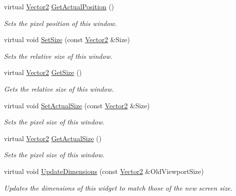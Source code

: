 \begin{DoxyCompactItemize}
virtual \hyperlink{classphys_1_1Vector2}{Vector2} \hyperlink{classphys_1_1UI_1_1Window_a811fb495bc698752e03778b18f2b1a30}{GetActualPosition} ()
\begin{DoxyCompactList}\small\item\em Sets the pixel position of this window. \item\end{DoxyCompactList}\item 
virtual void \hyperlink{classphys_1_1UI_1_1Window_a88ed4d21758cee9afeadc4069c3e0b04}{SetSize} (const \hyperlink{classphys_1_1Vector2}{Vector2} \&Size)
\begin{DoxyCompactList}\small\item\em Sets the relative size of this window. \item\end{DoxyCompactList}\item 
virtual \hyperlink{classphys_1_1Vector2}{Vector2} \hyperlink{classphys_1_1UI_1_1Window_a9946100eb6e6e985921bbea9e87cede3}{GetSize} ()
\begin{DoxyCompactList}\small\item\em Gets the relative size of this window. \item\end{DoxyCompactList}\item 
virtual void \hyperlink{classphys_1_1UI_1_1Window_a002150cd8db87283bead5f10b2310152}{SetActualSize} (const \hyperlink{classphys_1_1Vector2}{Vector2} \&Size)
\begin{DoxyCompactList}\small\item\em Sets the pixel size of this window. \item\end{DoxyCompactList}\item 
virtual \hyperlink{classphys_1_1Vector2}{Vector2} \hyperlink{classphys_1_1UI_1_1Window_a22f5ca800e44c5e2cfeed59c243b03ed}{GetActualSize} ()
\begin{DoxyCompactList}\small\item\em Sets the pixel size of this window. \item\end{DoxyCompactList}\item 
virtual void \hyperlink{classphys_1_1UI_1_1Window_a0be6c93e5660757a5f94227f2e076ba9}{UpdateDimensions} (const \hyperlink{classphys_1_1Vector2}{Vector2} \&OldViewportSize)
\begin{DoxyCompactList}\small\item\em Updates the dimensions of this widget to match those of the new screen size. \item\end{DoxyCompactList}\item 

\end{DoxyCompactItemize}
